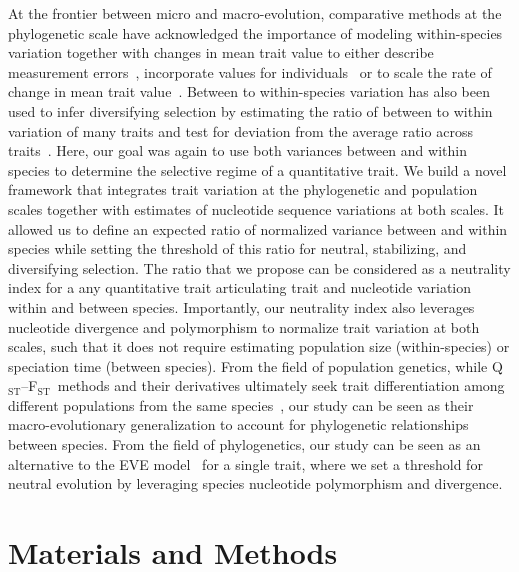 \documentclass{article}
\newcommand{\Qst}{Q$_\text{ST}$}
\newcommand{\Fst}{F$_\text{ST}$}
\newcommand{\QstFst}{\Qst--\Fst}
\begin{document}
At the frontier between micro and macro-evolution, comparative methods at the phylogenetic scale have acknowledged the importance of modeling within-species variation together with changes in mean trait value to either describe measurement errors~\citep{lynch_methods_1991, hansen_interpreting_2012}, incorporate values for individuals~\citep{felsenstein_comparative_2008} or to scale the rate of change in mean trait value~\citep{kostikova_bridging_2016, gaboriau_multiplatform_2020, gaboriau_exploring_2023}.
Between to within-species variation has also been used to infer diversifying selection by estimating the ratio of between to within variation of many traits and test for deviation from the average ratio across traits~\citep{rohlfs_modeling_2014, rohlfs_phylogenetic_2015}.
Here, our goal was again to use both variances between and within species to determine the selective regime of a quantitative trait.
We build a novel framework that integrates trait variation at the phylogenetic and population scales together with estimates of nucleotide sequence variations at both scales.
It allowed us to define an expected ratio of normalized variance between and within species while setting the threshold of this ratio for neutral, stabilizing, and diversifying selection.
The ratio that we propose can be considered as a neutrality index for a any quantitative trait articulating trait and nucleotide variation within and between species.
Importantly, our neutrality index also leverages nucleotide divergence and polymorphism to normalize trait variation at both scales, such that it does not require estimating population size (within-species) or speciation time (between species).
From the field of population genetics, while \QstFst\ methods and their derivatives ultimately seek trait differentiation among different populations from the same species~\citep{pujol_are_2008, ovaskainen_new_2011}, our study can be seen as their macro-evolutionary generalization to account for phylogenetic relationships between species.
From the field of phylogenetics, our study can be seen as an alternative to the EVE model~\citep{rohlfs_modeling_2014, rohlfs_phylogenetic_2015} for a single trait, where we set a threshold for neutral evolution by leveraging species nucleotide polymorphism and divergence.


\section*{Materials and Methods}\label{sec:materials-and-methods}
\end{document}
